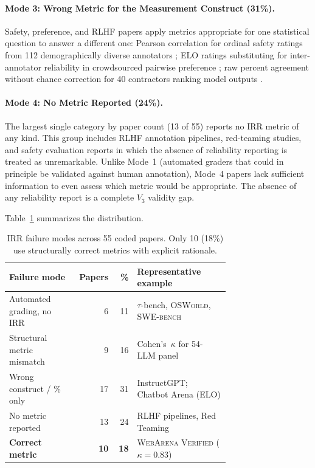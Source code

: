 \documentclass[preprint,12pt]{elsarticle}
\newcommand{\ck}{Cohen's~$\kappa$}
\begin{document}
\paragraph{Mode 3: Wrong Metric for the Measurement Construct (31\%).}
Safety, preference, and RLHF papers apply metrics appropriate for one statistical
question to answer a different one: Pearson correlation for ordinal safety ratings
from 112 demographically diverse annotators \citep{movva2024}; ELO ratings
substituting for inter-annotator reliability in crowdsourced pairwise preference
\citep{chiang2024}; raw percent agreement without chance correction for 40
contractors ranking model outputs \citep[72--77\%]{ouyang2022}.

\paragraph{Mode 4: No Metric Reported (24\%).}
The largest single category by paper count (13 of 55) reports no IRR metric of any
kind. This group includes RLHF annotation pipelines, red-teaming studies, and safety
evaluation reports in which the absence of reliability reporting is treated as
unremarkable. Unlike Mode~1 (automated graders that could in principle be validated
against human annotation), Mode~4 papers lack sufficient information to even assess
which metric would be appropriate. The absence of any reliability report is a
complete $V_3$ validity gap.

Table~\ref{tab:failure-modes} summarizes the distribution.

\begin{table}[ht]
\centering
\caption{IRR failure modes across 55 coded papers. Only 10 (18\%) use structurally
correct metrics with explicit rationale.}
\label{tab:failure-modes}
\small
\begin{tabular}{@{}p{0.30\linewidth}rr>{\raggedright\arraybackslash}p{0.42\linewidth}@{}}
\toprule
Failure mode & Papers & \% & Representative example \\
\midrule
Automated grading, no IRR         & 6  & 11 & $\tau$-bench, \textsc{OSWorld}, \textsc{SWE-bench} \\
Structural metric mismatch        & 9  & 16 & \ck{} for 54-LLM panel \citep{han2025} \\
Wrong construct / \% only         & 17 & 31 & InstructGPT; Chatbot Arena (ELO) \\
No metric reported                & 13 & 24 & RLHF pipelines, Red Teaming \\
\textbf{Correct metric}           & \textbf{10} & \textbf{18} & \textsc{WebArena Verified} ($\kappa = 0.83$) \\
\bottomrule
\end{tabular}
\end{table}
\end{document}
